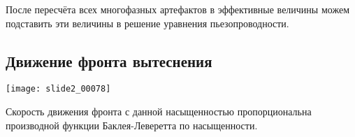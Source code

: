 \documentclass[main.tex]{subfiles}
\begin{document}
После пересчёта всех многофазных артефактов в эффективные величины можем подставить эти величины в решение уравнения пьезопроводности.





\subsection{Движение фронта вытеснения}

\texttt{[image: slide2\_00078]}


Скорость движения фронта с данной насыщенностью пропорциональна производной функции Баклея-Леверетта по насыщенности.








\end{document}
